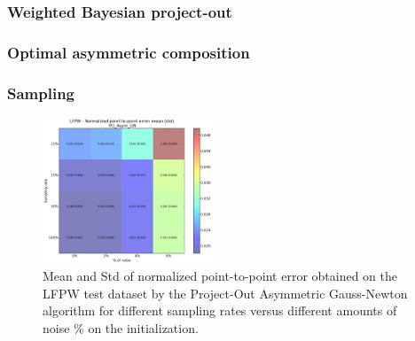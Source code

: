 





\subsubsection{Weighted Bayesian project-out}

\subsubsection{Optimal asymmetric composition}

\subsubsection{Sampling}

\begin{figure}[h!]
    \centering
    \includegraphics[width=0.45\textwidth]{experiments/noise_vs_sampling/po_asymmetric_gn/noise_vs_sampling_po_asymmetric.png}
    \caption{Mean and Std of normalized point-to-point error obtained on the LFPW test dataset by the Project-Out Asymmetric Gauss-Newton algorithm for different sampling rates versus different amounts of noise \% on the initialization.}
    \label{fig:noise_vs_sampling_po_asymmetric}
\end{figure}

